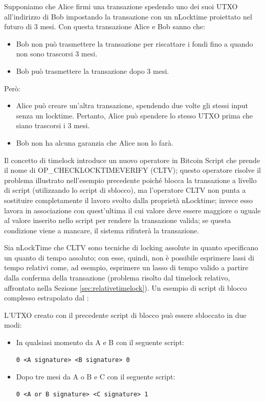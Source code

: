 \begin{example}

Supponiamo che Alice firmi una transazione spedendo uno dei suoi UTXO all'indirizzo di Bob impostando la transazione con un nLocktime proiettato nel futuro di 3 mesi.
Con questa transazione Alice e Bob sanno che:
\begin{itemize}
  \item Bob non può trasmettere la transazione per riscattare i fondi fino a quando non sono trascorsi 3 mesi.
  \item Bob può trasmettere la transazione dopo 3 mesi.
\end{itemize}
Però:
\begin{itemize}
  \item Alice può creare un'altra transazione, spendendo due volte gli stessi input senza un locktime. Pertanto, Alice può spendere lo stesso UTXO prima che siano trascorsi i 3 mesi.
  \item Bob non ha alcuna garanzia che Alice non lo farà.
\end{itemize}
\end{example}

Il concetto di timelock introduce un nuovo operatore in Bitcoin Script che prende il nome di OP\_CHECKLOCKTIMEVERIFY (CLTV); questo operatore risolve il problema illustrato nell’esempio precedente poiché blocca la  transazione a livello di script (utilizzando lo script di sblocco), ma l’operatore CLTV non punta a sostituire completamente il lavoro svolto dalla proprietà nLocktime; invece esso lavora in associazione con quest’ultima il cui valore deve essere maggiore o uguale al valore inserito nello script per rendere la transazione valida; se questa condizione viene a mancare, il sistema rifiuterà la transazione.

Sia nLockTime che CLTV sono tecniche di locking assolute in quanto specificano un quanto di tempo assoluto; con esse, quindi, non è possibile esprimere lassi di tempo relativi come, ad esempio, esprimere un lasso di tempo valido a partire dalla conferma della transazione (problema risolto dal timelock relativo, affrontato nella Sezione \ref{sec:relativetimelock}).
Un esempio di script di blocco complesso estrapolato dal \cite{bitcoinbip:bip68}:



L’UTXO creato con il precedente script di blocco può essere sbloccato in due modi:
\begin{itemize}
  \item In qualsiasi momento  da A e B con il seguente script:
  \begin{lstlisting}[language=bitcoinscript]
   0 <A signature> <B signature> 0
  \end{lstlisting}
  \item Dopo tre mesi da A o B e C con il seguente script:
  \begin{lstlisting}[language=bitcoinscript]
   0 <A or B signature> <C signature> 1
  \end{lstlisting}
\end{itemize}

